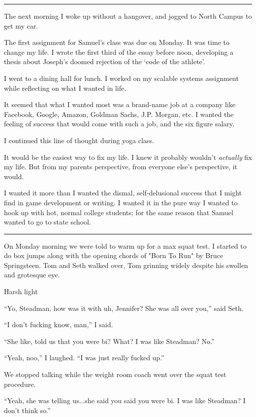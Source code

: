 \plainfancybreak{12pt}{2}{}

The next morning I woke up without a hangover, and jogged to North Campus to get
my car.  


The first assignment for Samuel's class was due on Monday.  It was time to
change my life.  I wrote the first third of the essay before noon, developing a
thesis about Joseph's doomed rejection of the `code of the athlete'.

I went to a dining hall for lunch.  I worked on my scalable systems assignment
while reflecting on what I wanted in life.

It seemed that what I wanted most was a brand-name job at a company like
Facebook, Google, Amazon, Goldman Sachs, J.P.  Morgan, etc.  I wanted the
feeling of success that would come with such a job, and the six figure salary.

I continued this line of thought during yoga class.

It would be the easiest way to fix my life.  I knew it probably wouldn't
\textit{actually} fix my life.  But from my parents perspective, from everyone
else's perspective, it would.  

I wanted it more than I wanted the dismal, self-delusional success that I might
find in game development or writing.  I wanted it in the pure way I wanted to
hook up with hot, normal college students; for the same reason that Samuel
wanted to go to state school. 

\plainfancybreak{12pt}{2}{}


On Monday morning we were told to warm up for a max squat test.  I started to do
box jumps along with the opening chords of "Born To Run" by Bruce Springsteen.
Tom and Seth walked over, Tom grinning widely despite his swollen and grotesque
eye. 


Harsh light

``Yo, Steadman, how was it with uh, Jennifer?  She was all over you,'' said
Seth.

``I don't fucking know, man,'' I said.

``She like, told us that you were bi?  What?  I was like Steadman?  No.''

``Yeah, noo,'' I laughed. ``I was just really fucked up.''

We stopped talking while the weight room coach went over the squat test
procedure.

``Yeah, she was telling us...she said you said you were bi.  I was like
Steadman?  I don't think so.''

